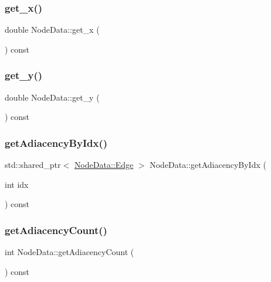 \subsubsection{\texorpdfstring{get\_x()}{get\_x()}}
{\footnotesize\ttfamily double Node\+Data\+::get\+\_\+x (\begin{DoxyParamCaption}{ }\end{DoxyParamCaption}) const\hspace{0.3cm}{\ttfamily [inline]}}

\mbox{\label{class_node_data_a005e2c27397f6c65c778cc740d96c838}} 
\subsubsection{\texorpdfstring{get\_y()}{get\_y()}}
{\footnotesize\ttfamily double Node\+Data\+::get\+\_\+y (\begin{DoxyParamCaption}{ }\end{DoxyParamCaption}) const\hspace{0.3cm}{\ttfamily [inline]}}

\mbox{\label{class_node_data_ae1dc0dbfdfd10a0e0c971cba66323e6d}} 
\subsubsection{\texorpdfstring{getAdiacencyByIdx()}{getAdiacencyByIdx()}}
{\footnotesize\ttfamily std\+::shared\+\_\+ptr$<$ \mbox{\hyperlink{struct_node_data_1_1_edge}{Node\+Data\+::\+Edge}} $>$ Node\+Data\+::get\+Adiacency\+By\+Idx (\begin{DoxyParamCaption}\item[{int}]{idx }\end{DoxyParamCaption}) const}

\mbox{\label{class_node_data_af3dfaeb5d55486bc12673ae2bfdc77f3}} 
\subsubsection{\texorpdfstring{getAdiacencyCount()}{getAdiacencyCount()}}
{\footnotesize\ttfamily int Node\+Data\+::get\+Adiacency\+Count (\begin{DoxyParamCaption}{ }\end{DoxyParamCaption}) const}

